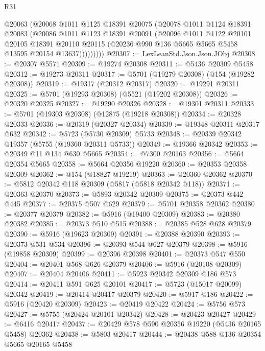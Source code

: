 \begin{lexlean}{R31}
\begin{coremodule}
            @20063
            (@20068
              @1011
              @1125
              @18391
              @20075
              (@20078
                @1011
                @1124
                @18391
                @20083
                (@20086
                  @1011
                  @1123
                  @18391
                  @20091
                  (@20096
                    @1011
                    @1122
                    @20101
                    @20105
                    @18391
                    @20110
                    @20115
                    (@20236 @990 @136 @5665 @5665 @5458 @13595 @20154 @13637)))))))))
@20307 := LexLeanStd.Json.Json.JObj
@20308 := @20307 @5571
@20309 := @19274 @20308
@20311 := @5436 @20309 @5458
@20312 := @19273 @20311
@20317 := @5701 (@19279 @20308) (@154 (@19282 @20308))
@20319 := @19317 (@20312 @20317)
@20320 := @19291 @20311
@20325 := @5701 (@19293 @20308) (@5521 (@19202 @20308))
@20326 := @20320 @20325
@20327 := @19290 @20326
@20328 := @19301 @20311
@20333 := @5701 (@19303 @20308) (@12875 (@19218 @20308))
@20334 := @20328 @20333
@20336 := @20319 (@20327 @20334)
@20339 := @19348 @20311 @20317 @632
@20342 := @5723 (@5730 @20309) @5733
@20348 := @20339 @20342 @19357 (@5755 (@19360 @20311 @5733))
@20349 := @19366 @20342
@20353 := @20349 @11 @134 @630 @5665
@20354 := @7300 @20163
@20356 := @5664 @20354 @5665
@20358 := @5664 @20356 @19220
@20360 := @20353 @20358 @20309
@20362 := @154 (@18827 @19219)
@20363 := @20360 @20362
@20370 := @5812 @20342 @118 @20309 (@5817 (@5818 @20342 @118))
@20371 := @20363 @20370
@20373 := @5893 @20342 @20309
@20375 := @20373 @442 @445
@20377 := @20375 @507 @629
@20379 := @5701 @20358 @20362
@20380 := @20377 @20379
@20382 := @5916 (@19400 @20309)
@20383 := @20380 @20382
@20385 := @20373 @510 @515
@20388 := @20385 @528 @628 @20379
@20390 := @5916 (@19623 @20309)
@20391 := @20388 @20390
@20393 := @20373 @531 @534
@20396 := @20393 @544 @627 @20379
@20398 := @5916 (@19858 @20309)
@20399 := @20396 @20398
@20401 := @20373 @547 @550
@20404 := @20401 @568 @626 @20379
@20406 := @5916 (@20108 @20309)
@20407 := @20404 @20406
@20411 := @5923 @20342 @20309 @186 @573
@20414 := @20411 @591 @625 @20101
@20417 := @5723 (@15017 @20099) @20342
@20419 := @20414 @20417 @20379
@20420 := @5917 @186
@20422 := @5916 (@20420 @20309)
@20423 := @20419 @20422
@20424 := @5756 @573
@20427 := @5755 (@20424 @20101 @20342)
@20428 := @20423 @20427
@20429 := @6416 @20417
@20437 := @20429 @578 @590 @20356 @19220 (@5436 @20165 @5458) @20362
@20438 := @5803 @20417
@20444 := @20438 @588 @136 @20354 @5665 @20165 @5458

\end{coremodule}
\end{lexlean}
